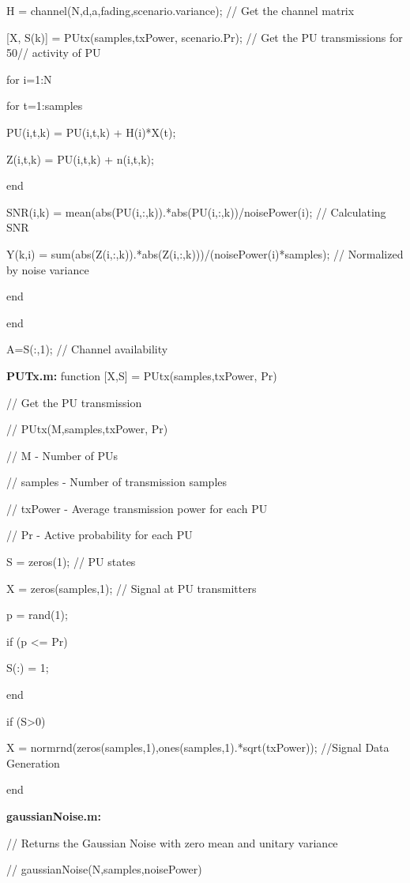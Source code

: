     H = channel(N,d,a,fading,scenario.variance);                      // Get the channel matrix             

    [X, S(k)] = PUtx(samples,txPower, scenario.Pr); // Get the PU transmissions for 50// activity of PU

    for i=1:N

        for t=1:samples

            PU(i,t,k) = PU(i,t,k) + H(i)*X(t);

            Z(i,t,k) = PU(i,t,k) + n(i,t,k);

        end

        SNR(i,k) = mean(abs(PU(i,:,k)).*abs(PU(i,:,k))/noisePower(i);		// Calculating SNR

        Y(k,i) = sum(abs(Z(i,:,k)).*abs(Z(i,:,k)))/(noisePower(i)*samples); // Normalized by noise variance

    end

end

A=S(:,1); // Channel availability






\textbf{PUTx.m:}
function [X,S] = PUtx(samples,txPower, Pr)

// Get the PU transmission

// PUtx(M,samples,txPower, Pr)

// M - Number of PUs

// samples - Number of transmission samples

// txPower - Average transmission power for each PU

// Pr - Active probability for each PU

S = zeros(1); // PU states

X = zeros(samples,1); // Signal at PU transmitters

    p = rand(1);

    if (p <= Pr)

        S(:) = 1;

    end


if (S>0)

    X = normrnd(zeros(samples,1),ones(samples,1).*sqrt(txPower)); //Signal Data Generation

end




\textbf{gaussianNoise.m:}

// Returns the Gaussian Noise with zero mean and unitary variance

// gaussianNoise(N,samples,noisePower)

